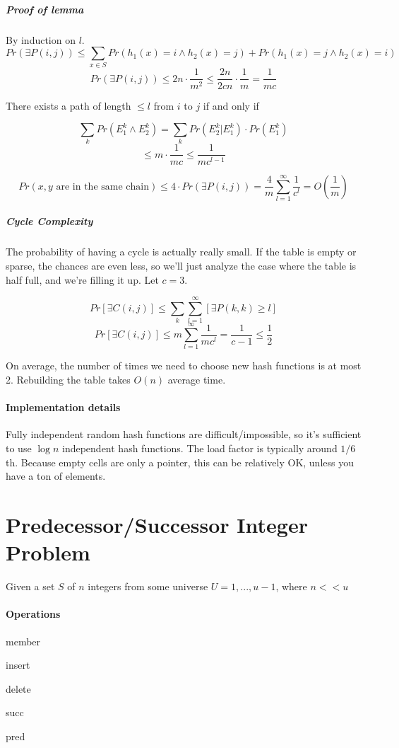 \documentclass[a4paper]{article}
\newenvironment{itemize*}%
  {\begin{itemize}%
    \setlength{\itemsep}{0pt}%
    \setlength{\parsep}{0pt}%
    \setlength{\parskip}{0pt}}%
  {\end{itemize}}
\begin{document}
\subparagraph{Proof of lemma}
By induction on $l$.
\[Pr(\exists P(i,j)) \le \sum_{x\in S} Pr(h_1(x)=i \land h_2(x)=j) + Pr(h_1(x)=j \land h_2(x)=i)\]
\[Pr(\exists P(i,j)) \le 2n\cdot\frac{1}{m^2} \le \frac{2n}{2cn}\cdot \frac{1}{m}=\frac{1}{mc}\]

There exists a path of length $\le l$ from $i$ to $j$ if and only if 

\[\sum_{k} Pr(E_1^k \land E_2^k)=\sum_{k} Pr(E_2^k | E_1^k) \cdot Pr(E_1^k)\]
\[\le m\cdot\frac{1}{mc} \le \frac{1}{mc^{l-1}} \]

\[Pr(x,y\text{ are in the same chain})\le 4\cdot Pr(\exists P(i,j))=\frac{4}{m}\sum_{l=1}^\infty \frac{1}{c^l}=O(\frac{1}{m})\]

\subparagraph{Cycle Complexity}
The probability of having a cycle is actually really small. If the table is empty or sparse, the chances are even less, so we'll just analyze the case where the table is half full, and we're filling it up. Let $c=3$.

\[Pr[\exists C(i,j)] \le \sum_{k}\sum_{l=1}^\infty[\exists P(k,k) \ge l]\]
\[Pr[\exists C(i,j)] \le m \sum_{l=1}^\infty \frac{1}{mc^l}=\frac{1}{c-1}\le\frac{1}{2}\]

On average, the number of times we need to choose new hash functions is at most 2. Rebuilding the table takes $O(n)$ average time.

\paragraph{Implementation details}
Fully independent random hash functions are difficult/impossible, so it's sufficient to use $\log n$ independent hash functions. The load factor is typically around $1/6$th. Because empty cells are only a pointer, this can be relatively OK, unless you have a ton of elements.

\section{Predecessor/Successor Integer Problem}
Given a set $S$ of $n$ integers from some universe $U=1,...,u-1$, where $n << u$

\paragraph{Operations}
\begin{itemize*}
  \item member
  \item insert
  \item delete
  \item succ
  \item pred
\end{itemize*}
\end{document}
